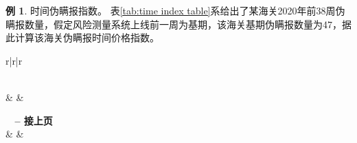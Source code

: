 \documentclass[a4paper]{tufte-book}%
\theoremstyle{definition}
\theoremstyle{definition}
\newtheorem{Example}{\hspace{2em}例}[section]
\begin{document}
\begin{Example}时间伪瞒报指数。
	表\ref{tab:time index table}系给出了某海关2020年前38周伪瞒报数量，假定风险测量系统上线前一周为基期，该海关基期伪瞒报数量为47，据此计算该海关伪瞒报时间价格指数。
	
	\begin{center}
		\begin{longtable}{r|r|r}
			\caption{时间伪瞒报指数} \label{tab:time index table} \\
			
			\hline {} &  &  \\ \hline 
			\endfirsthead
			
			{{\bfseries \tablename\ \thetable{} -- 接上页}} \\
			\hline {} &  &  \\ \hline  
			\endhead
			
			\hline {} \\ \hline
			\endfoot
			

\end{longtable}
\end{center}
\end{Example}
\end{document}
